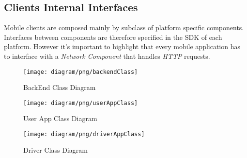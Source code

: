 \subsection{Clients Internal Interfaces}
\label{sub:back_end_interfaces}
Mobile clients are composed mainly by subclass of platform specific components.\\
Interfaces between components are therefore specified in the SDK of each platform.
However it's important to highlight that every mobile application has to interface with a \emph{Network Component} that handles \emph{HTTP} requests.\\

\newpage
\vfill
\begin{figure}[h!t]
\caption{BackEnd Class Diagram}
\texttt{[image: diagram/png/backendClass]}
\centering
\end{figure}
\vfill
\clearpage

\newpage
\vfill
\begin{figure}[h!t]
\caption{User App Class Diagram}
\texttt{[image: diagram/png/userAppClass]}
\centering
\end{figure}
\vfill
\clearpage


\newpage
\vfill
\begin{figure}[h!t]
\caption{Driver Class Diagram}
\texttt{[image: diagram/png/driverAppClass]}
\centering
\end{figure}
\vfill
\clearpage






